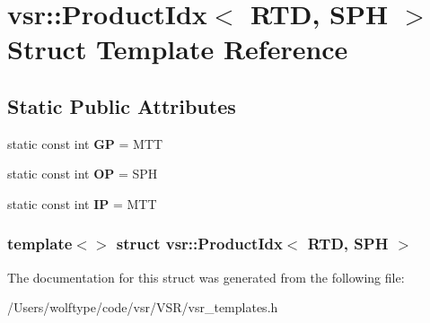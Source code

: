 \hypertarget{structvsr_1_1_product_idx_3_01_r_t_d_00_01_s_p_h_01_4}{\section{vsr\-:\-:Product\-Idx$<$ R\-T\-D, S\-P\-H $>$ Struct Template Reference}
\label{structvsr_1_1_product_idx_3_01_r_t_d_00_01_s_p_h_01_4}
}
\subsection*{Static Public Attributes}
\begin{DoxyCompactItemize}
\item 
\hypertarget{structvsr_1_1_product_idx_3_01_r_t_d_00_01_s_p_h_01_4_ace919d3ad5527509463bad4700583a81}{static const int {\bfseries G\-P} = M\-T\-T}\label{structvsr_1_1_product_idx_3_01_r_t_d_00_01_s_p_h_01_4_ace919d3ad5527509463bad4700583a81}

\item 
\hypertarget{structvsr_1_1_product_idx_3_01_r_t_d_00_01_s_p_h_01_4_a06d22ce3a1f5cb798271e6a12104b7b1}{static const int {\bfseries O\-P} = S\-P\-H}\label{structvsr_1_1_product_idx_3_01_r_t_d_00_01_s_p_h_01_4_a06d22ce3a1f5cb798271e6a12104b7b1}

\item 
\hypertarget{structvsr_1_1_product_idx_3_01_r_t_d_00_01_s_p_h_01_4_afe7f922b72a8659530b8d308db79628b}{static const int {\bfseries I\-P} = M\-T\-T}\label{structvsr_1_1_product_idx_3_01_r_t_d_00_01_s_p_h_01_4_afe7f922b72a8659530b8d308db79628b}

\end{DoxyCompactItemize}
\subsubsection*{template$<$$>$ struct vsr\-::\-Product\-Idx$<$ R\-T\-D, S\-P\-H $>$}



The documentation for this struct was generated from the following file\-:\begin{DoxyCompactItemize}
\item 
/\-Users/wolftype/code/vsr/\-V\-S\-R/vsr\-\_\-templates.\-h\end{DoxyCompactItemize}
